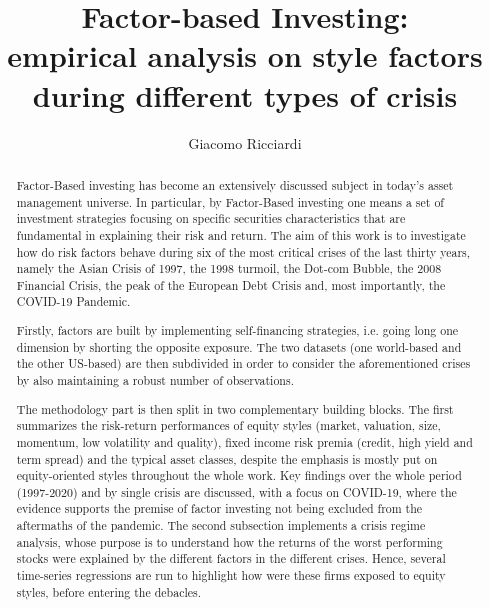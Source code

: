 \documentclass[12pt]{article}
\begin{document}
\title{Factor-based Investing: \\ empirical analysis on style factors during different types of crisis}
\author{Giacomo Ricciardi}

\date{}
\maketitle{}

\begin{abstract}
Factor-Based investing has become an extensively discussed subject in today’s asset management universe. In particular, by Factor-Based investing one means a set of investment strategies focusing on specific securities characteristics that are fundamental in explaining their risk and return. The aim of this work is to investigate how do risk factors behave during six of the most critical crises of the last thirty years, namely the Asian Crisis of 1997, the 1998 turmoil, the Dot-com Bubble, the 2008 Financial Crisis, the peak of the European Debt Crisis and, most importantly, the COVID-19 Pandemic. 

Firstly, factors are built by implementing self-financing strategies, i.e. going long one dimension by shorting the opposite exposure. The two datasets (one world-based and the other US-based) are then subdivided in order to consider the aforementioned crises by also maintaining a robust number of observations.

The methodology part is then split in two complementary building blocks. The first summarizes the risk-return performances of equity styles (market, valuation, size, momentum, low volatility and quality), fixed income risk premia (credit, high yield and term spread) and the typical asset classes, despite the emphasis is mostly put on equity-oriented styles throughout the whole work. Key findings over the whole period (1997-2020) and by single crisis are discussed, with a focus on COVID-19, where the evidence supports the premise of factor investing not being excluded from the aftermaths of the pandemic. The second subsection implements a crisis regime analysis, whose purpose is to understand how the returns of the worst performing stocks were explained by the different factors in the different crises. Hence, several time-series regressions are run to highlight how were these firms exposed to equity styles, before entering the debacles.


\end{abstract}
\end{document}
